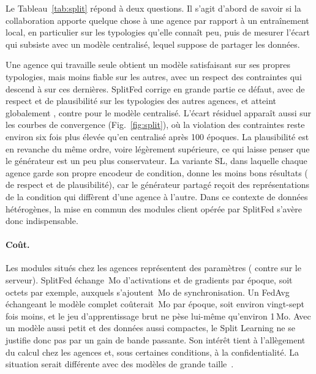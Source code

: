 \documentclass[twocolumn]{ICCKjournal}
\begin{document}
Le Tableau~\ref{tab:split} répond à deux questions. Il s'agit d'abord de
savoir si la collaboration apporte quelque chose à une agence par
rapport à un entraînement local, en particulier sur les typologies
qu'elle connaît peu, puis de mesurer l'écart qui subsiste avec un modèle
centralisé, lequel suppose de partager les données.

Une agence qui travaille seule obtient un modèle satisfaisant sur ses
propres typologies, mais moins fiable sur les autres, avec un respect
des contraintes qui descend à \resSlLocalEtrangerRespectBrut{} sur ces
dernières. SplitFed corrige en grande partie ce défaut, avec
\resSlSplitfedEtrangerRespectBrut{} de respect et
\resSlSplitfedEtrangerPlausibilite{} de plausibilité sur les typologies
des autres agences, et atteint globalement
\resSlSplitfedGlobalRespectBrut{}, contre
\resSlCentraliseGlobalRespectBrut{} pour le modèle centralisé. L'écart
résiduel apparaît aussi sur les courbes de convergence
(Fig.~\ref{fig:split}), où la violation des contraintes reste environ
six fois plus élevée qu'en centralisé après 100 époques. La
plausibilité est en revanche du même ordre, voire légèrement supérieure,
ce qui laisse penser que le générateur est un peu plus conservateur. La
variante SL, dans laquelle chaque agence garde son propre encodeur de
condition, donne les moins bons résultats
(\resSlSlGlobalRespectBrut{} de respect et \resSlSlGlobalPlausibilite{}
de plausibilité), car le générateur partagé reçoit des représentations
de la condition qui diffèrent d'une agence à l'autre. Dans ce contexte
de données hétérogènes, la mise en commun des modules client opérée par
SplitFed s'avère donc indispensable.

\paragraph{Coût.}
Les modules situés chez les agences représentent \resSlClientShare{} des
paramètres (\resSlParamsClient{} contre \resSlParamsServer{} sur le
serveur). SplitFed échange \resSlSplitfedMoEpoch{}\,Mo d'activations et
de gradients par époque, soit \resSlSplitfedOctetsSample{} octets par
exemple, auxquels s'ajoutent \resSlSyncMoEpoch{}\,Mo de synchronisation.
Un FedAvg échangeant le modèle complet coûterait \resSlFlMoEpoch{}\,Mo
par époque, soit environ vingt-sept fois moins, et le jeu
d'apprentissage brut ne pèse lui-même qu'environ 1\,Mo. Avec un modèle
aussi petit et des données aussi compactes, le Split Learning ne se
justifie donc pas par un gain de bande passante. Son intérêt tient à
l'allègement du calcul chez les agences et, sous certaines conditions,
à la confidentialité. La situation serait différente avec des modèles
de grande taille~\cite{Singh2019CommEfficiency}.
\end{document}
